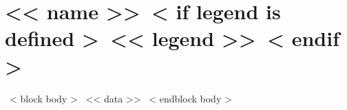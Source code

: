 \section{<< name >>~< if legend is defined >~\hfill{\normalsize\normalfont<< legend >>}~< endif >~}
  ~< block body >~
    << data >>
  ~< endblock body >~
